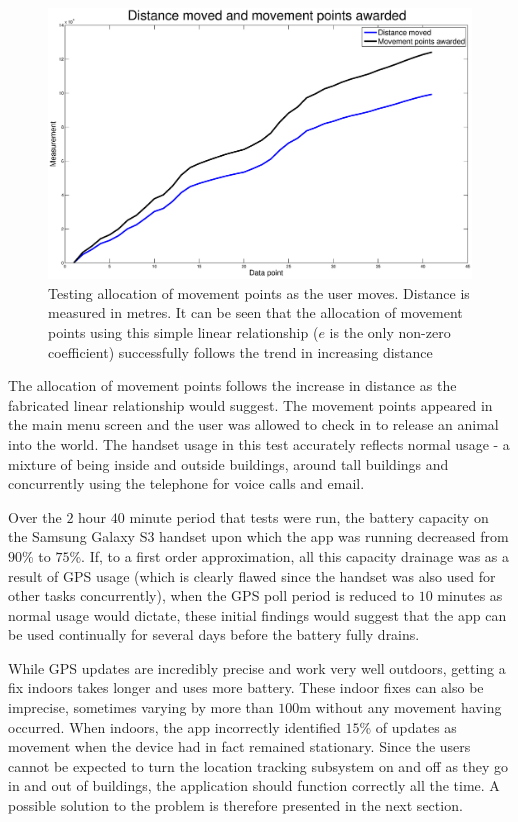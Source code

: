 \documentclass[12pt,a4paper,twoside]{article}
\begin{document}
\begin{figure}
\label{fig:gpstestresults}
\begin{center}
\includegraphics[scale=0.35]{mpoints.eps}
\end{center}
\vspace{-5mm}
\caption{Testing allocation of movement points as the user moves. Distance is measured in metres. It can be seen that the allocation of movement points using this simple linear relationship ($e$ is the only non-zero coefficient) successfully follows the trend in increasing distance}
\end{figure}

The allocation of movement points follows the increase in distance as the fabricated linear relationship would suggest. The movement points appeared in the main menu screen and the user was allowed to check in to release an animal into the world. The handset usage in this test accurately reflects normal usage - a mixture of being inside and outside buildings, around tall buildings and concurrently using the telephone for voice calls and email.

Over the $2$ hour $40$ minute period that tests were run, the battery capacity on the Samsung Galaxy S$3$ handset upon which the app was running decreased from $90$\% to $75$\%. If, to a first order approximation, all this capacity drainage was as a result of GPS usage (which is clearly flawed since the handset was also used for other tasks concurrently), when the GPS poll period is reduced to $10$ minutes as normal usage would dictate, these initial findings would suggest that the app can be used continually for several days before the battery fully drains.

While GPS updates are incredibly precise and work very well outdoors, getting a fix indoors takes longer and uses more battery. These indoor fixes can also be imprecise, sometimes varying by more than $100$m without any movement having occurred. When indoors, the app incorrectly identified $15$\% of updates as movement when the device had in fact remained stationary. Since the users cannot be expected to turn the location tracking subsystem on and off as they go in and out of buildings, the application should function correctly all the time. A possible solution to the problem is therefore presented in the next section.
\end{document}
